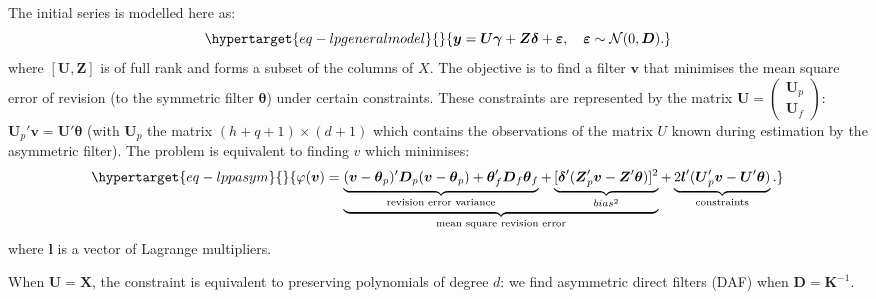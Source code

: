 \documentclass[
]{article}
\newcommand\1{\mathds{1}}
\begin{document}
The initial series is modelled here as:
\begin{equation}\protect\hypertarget{eq-lpgeneralmodel}{}{
\boldsymbol y=\boldsymbol U \boldsymbol \gamma+\boldsymbol Z\boldsymbol \delta+\boldsymbol \varepsilon,\quad
\boldsymbol \varepsilon\sim\mathcal{N}(0,\boldsymbol D).
}\label{eq-lpgeneralmodel}\end{equation} where
\([\boldsymbol U,\boldsymbol Z]\) is of full rank and forms a subset of
the columns of \(X\). The objective is to find a filter
\(\boldsymbol v\) that minimises the mean square error of revision (to
the symmetric filter \(\boldsymbol \theta\)) under certain constraints.
These constraints are represented by the matrix
\(\boldsymbol U=\begin{pmatrix}\boldsymbol U_{p}\\\boldsymbol U_{f}\end{pmatrix}\):
\(\boldsymbol U_p'\boldsymbol v=\boldsymbol U'\boldsymbol \theta\) (with
\(\boldsymbol U_p\) the matrix \((h+q+1)\times (d+1)\) which contains
the observations of the matrix \(U\) known during estimation by the
asymmetric filter). The problem is equivalent to finding \(v\) which
minimises: \begin{equation}\protect\hypertarget{eq-lppasym}{}{
\varphi(\boldsymbol v)=
\underbrace{
  \underbrace{(\boldsymbol v-\boldsymbol \theta_{p})'\boldsymbol D_{p}(\boldsymbol v-\boldsymbol \theta_{p})+
  \boldsymbol \theta_{f}'\boldsymbol D_{f}\boldsymbol \theta_{f}}_\text{revision error variance}+
  \underbrace{[\boldsymbol \delta'(\boldsymbol Z_{p}'\boldsymbol v-\boldsymbol Z'\boldsymbol \theta)]^{2}}_{bias^2}
}_\text{mean square revision error}+
\underbrace{2\boldsymbol l'(\boldsymbol U_{p}'\boldsymbol v-\boldsymbol U'\boldsymbol \theta)}_{\text{constraints}}.
}\label{eq-lppasym}\end{equation} where \(\boldsymbol l\) is a vector of
Lagrange multipliers.

When \(\boldsymbol U=\boldsymbol X\), the constraint is equivalent to
preserving polynomials of degree \(d\): we find asymmetric direct
filters (DAF) when \(\boldsymbol D=\boldsymbol K^{-1}\).
\end{document}
